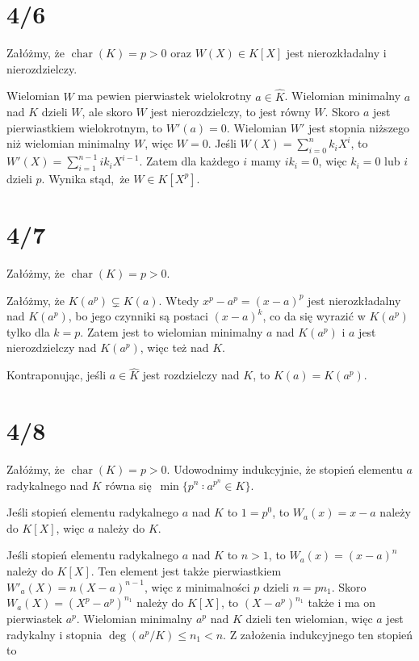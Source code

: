 \documentclass[a4paper, 12pt]{article}
\title{}
\author{Wiktor Kuchta}
\date{\vspace{-4ex}}
\DeclareMathOperator{\Char}{char}
\newcommand{\+}{\enspace}
\begin{document}
\maketitle
\section*{4/6}
Załóżmy, że $\Char(K) = p > 0$ oraz $W(X) ∈ K[X]$ jest nierozkładalny
i nierozdzielczy.

Wielomian $W$ ma pewien pierwiastek wielokrotny $a∈\hat{K}$.
Wielomian minimalny $a$ nad $K$ dzieli $W$, ale skoro $W$ jest
nierozdzielczy, to jest równy $W$.
Skoro $a$ jest pierwiastkiem wielokrotnym, to $W'(a) = 0$.
Wielomian $W'$ jest stopnia niższego niż wielomian minimalny $W$,
więc $W=0$.
Jeśli $W(X) = ∑_{i=0}^n k_i X^i$, to $W'(X) = ∑_{i=1}^{n-1} i k_i X^{i-1}$.
Zatem dla każdego $i$ mamy $ik_i = 0$, więc $k_i = 0$ lub $i$ dzieli $p$.
Wynika stąd, że $W∈K[X^p]$.

\section*{4/7}
Załóżmy, że $\Char(K) = p > 0$.

Załóżmy, że $K(a^p) \subsetneq K(a)$.
Wtedy $x^p-a^p=(x-a)^p$ jest nierozkładalny nad
$K(a^p)$, bo jego czynniki są postaci $(x-a)^k$,
co da się wyrazić w $K(a^p)$ tylko dla $k=p$.
Zatem jest to wielomian minimalny $a$ nad $K(a^p)$
i $a$ jest nierozdzielczy nad $K(a^p)$, więc też nad $K$.

Kontraponując, jeśli $a∈\hat{K}$ jest rozdzielczy nad $K$,
to $K(a) = K(a^p)$.



\section*{4/8}
\iffalse
Załóżmy, że $\Char(K) = p > 0$.
Udowodnimy indukcyjnie,
że stopień elementu $a$ radykalnego nad $K$
równa się $\min \{p^n ∶ a^{p^n} ∈ K \}$.

Jeśli stopień elementu radykalnego $a$ nad $K$
to $1 = p^0$, to $W_a(x) = x-a$ należy do $K[X]$,
więc $a$ należy do $K$.

Jeśli stopień elementu radykalnego $a$ nad $K$
to $n > 1$, to $W_a(x) = (x-a)^n$ należy do $K[X]$.
Ten element jest także pierwiastkiem $W'_a(X) = n(X-a)^{n-1}$,
więc z minimalności $p$ dzieli $n=p n_1$.
Skoro $W_a(X) = (X^p-a^p)^{n_1}$ należy do $K[X]$,
to $(X-a^p)^{n_1}$ także i ma on pierwiastek $a^p$.
Wielomian minimalny $a^p$ nad $K$ dzieli ten wielomian,
więc $a$ jest radykalny i stopnia $\deg(a^p/K) ≤ n_1 < n$.
Z założenia indukcyjnego ten stopień to 
\end{document}
